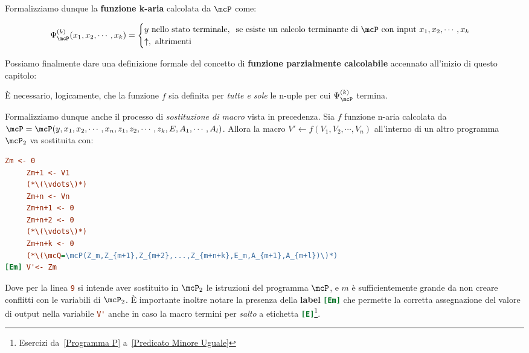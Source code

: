 Formalizziamo dunque la \textbf{funzione k-aria} calcolata da \(\mcP\) come:

\begin{equation}
  \Psi_{\mcP}^{(k)}(x_1,x_2,\cdots,x_k)=\begin{cases}
    y \text{ nello stato terminale}, \;\; \text{se esiste un calcolo terminante di } \mcP \text{ con input } x_1,x_2,\cdots,x_k\\
    \uparrow, \text{ altrimenti}
  \end{cases}
  \label{Funzione k-aria di P Eq}
\end{equation}

Possiamo finalmente dare una definizione formale del concetto di \textbf{funzione parzialmente calcolabile} accennato all'inizio di questo capitolo:


È necessario, logicamente, che la funzione \(f\) sia definita per \textit{tutte e sole} le n-uple per cui \(\Psi_{\mcP}^{(k)}\) termina.

Formalizziamo dunque anche il processo di \textit{sostituzione di macro} vista in precedenza.
Sia \(f\) funzione n-aria calcolata da \(\mcP=\mcP(y,x_1,x_2,\cdots,x_n,z_1,z_2,\cdots,z_k,E,A_1,\cdots,A_l)\). Allora la macro \(V'\leftarrow f(V_1,V_2,\cdots,V_n)\) all'interno di un altro programma \(\mcP_2\) va sostituita con:
\begin{lstlisting}[language=ini, label={Macro Formalizzata}, caption=Macro]
     Zm <- 0
     Zm+1 <- V1
     (*\(\vdots\)*)
     Zm+n <- Vn
     Zm+n+1 <- 0
     Zm+n+2 <- 0
     (*\(\vdots\)*)
     Zm+n+k <- 0
     (*\(\mcQ=\mcP(Z_m,Z_{m+1},Z_{m+2},...,Z_{m+n+k},E_m,A_{m+1},A_{m+l})\)*)
[Em] V'<- Zm
\end{lstlisting}

Dove per la linea \lstinline[language=ini]{9} si intende aver sostituito in \(\mcP_2\) le istruzioni del programma \(\mcP\), e \(m\) è sufficientemente grande da non creare conflitti con le variabili di \(\mcP_2\). È importante inoltre notare la presenza della \textbf{label} \lstinline[language=ini]{[Em]} che permette la corretta assegnazione del valore di output nella variabile \lstinline[language=ini]{V'} anche in caso la macro termini per \textit{salto} a etichetta \lstinline[language=ini]{[E]}\footnote{Esercizi da~\ref{Programma P} a~\ref{Predicato Minore Uguale}}.

